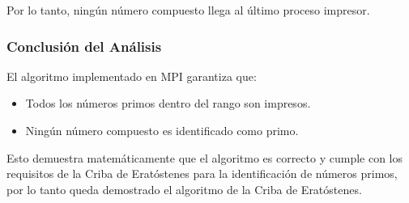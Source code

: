 \documentclass[a4paper,12pt]{article}
\begin{document}
Por lo tanto, ningún número compuesto llega al último proceso impresor.

\subsubsection{Conclusión del Análisis}

El algoritmo implementado en MPI garantiza que:
\begin{itemize}
    \item Todos los números primos dentro del rango son impresos.
    \item Ningún número compuesto es identificado como primo.
\end{itemize}

Esto demuestra matemáticamente que el algoritmo es correcto y cumple con los requisitos de la Criba de Eratóstenes para la identificación de números primos, por lo tanto queda demostrado el algoritmo de la Criba de Eratóstenes.
\end{document}
